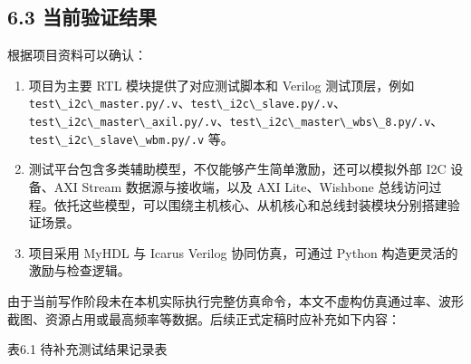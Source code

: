 \subsection{6.3
当前验证结果}\label{ux5f53ux524dux9a8cux8bc1ux7ed3ux679c}

根据项目资料可以确认：

\begin{enumerate}
\def\labelenumi{\arabic{enumi}.}
\tightlist
\item
  项目为主要 RTL 模块提供了对应测试脚本和 Verilog 测试顶层，例如
  \passthrough{\lstinline!test\_i2c\_master.py/.v!}、\passthrough{\lstinline!test\_i2c\_slave.py/.v!}、\passthrough{\lstinline!test\_i2c\_master\_axil.py/.v!}、\passthrough{\lstinline!test\_i2c\_master\_wbs\_8.py/.v!}、\passthrough{\lstinline!test\_i2c\_slave\_wbm.py/.v!}
  等。
\item
  测试平台包含多类辅助模型，不仅能够产生简单激励，还可以模拟外部 I2C
  设备、AXI Stream 数据源与接收端，以及 AXI Lite、Wishbone
  总线访问过程。依托这些模型，可以围绕主机核心、从机核心和总线封装模块分别搭建验证场景。
\item
  项目采用 MyHDL 与 Icarus Verilog 协同仿真，可通过 Python
  构造更灵活的激励与检查逻辑。
\end{enumerate}

由于当前写作阶段未在本机实际执行完整仿真命令，本文不虚构仿真通过率、波形截图、资源占用或最高频率等数据。后续正式定稿时应补充如下内容：

表6.1 待补充测试结果记录表

